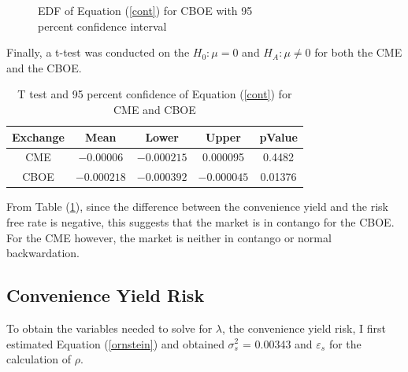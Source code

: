 \documentclass{paper}
\let\oldref\ref
\renewcommand{\ref}[1]{(\oldref{#1})}
\begin{document}
\begin{doublespacing}
\begin{figure}[H]
\begin{minipage}{0.5\textwidth}
        \caption{EDF of Equation \ref{cont} for CBOE with 95\\ percent confidence interval}\label{edfcboe}
    \end{minipage}
\end{figure}
Finally, a t-test was conducted on the $H_{0}: \mu = 0$ and $H_{A}: \mu \neq 0$ for both the CME and the CBOE.
\begin{table}[H]
\centering
\begin{tabular}{|c | c | c  c | c |}\hline
Exchange & Mean & Lower & Upper & pValue\\\hline
CME & $-0.00006$  & $-0.000215$ & 0.000095 & 0.4482\\
CBOE &$-0.000218$ & $-0.000392$ & $-0.000045$ & 0.01376\\\hline
\end{tabular}
\caption{T test and 95 percent confidence of Equation \ref{cont} for CME and CBOE}\label{tcont}
\end{table}
From Table \ref{tcont}, since the difference between the convenience yield and the risk free rate is negative, this suggests that the market is in contango for the CBOE. For the CME however, the market is neither in contango or normal backwardation.
\subsection{Convenience Yield Risk}
To obtain the variables needed to solve for $\lambda$, the convenience yield risk, I first estimated Equation \ref{ornstein} and obtained $\sigma^{2}_{s}$ = 0.00343 and $\varepsilon_{s}$ for the calculation of $\rho$. 


\end{doublespacing}
\end{document}
